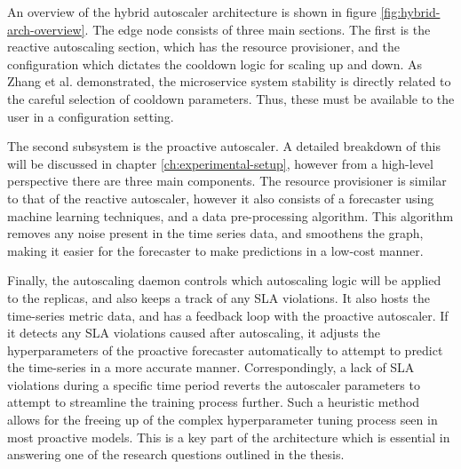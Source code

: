 An overview of the hybrid autoscaler architecture is shown in figure \ref{fig:hybrid-arch-overview}. The edge node consists of three main sections. The first is the reactive autoscaling section, which has the resource provisioner, and the configuration which dictates the cooldown logic for scaling up and down. As Zhang et al. \cite{zhang2019quantifying} demonstrated, the microservice system stability is directly related to the careful selection of cooldown parameters. Thus, these must be available to the user in a configuration setting.\par

The second subsystem is the proactive autoscaler. A detailed breakdown of this will be discussed in chapter \ref{ch:experimental-setup}, however from a high-level perspective there are three main components. The resource provisioner is similar to that of the reactive autoscaler, however it also consists of a forecaster using machine learning techniques, and a data pre-processing algorithm. This algorithm removes any noise present in the time series data, and smoothens the graph, making it easier for the forecaster to make predictions in a low-cost manner.\par

Finally, the autoscaling daemon controls which autoscaling logic will be applied to the replicas, and also keeps a track of any SLA violations. It also hosts the time-series metric data, and has a feedback loop with the proactive autoscaler. If it detects any SLA violations caused after autoscaling, it adjusts the hyperparameters of the proactive forecaster automatically to attempt to predict the time-series in a more accurate manner. Correspondingly, a lack of SLA violations during a specific time period reverts the autoscaler parameters to attempt to streamline the training process further. Such a heuristic method allows for the freeing up of the complex hyperparameter tuning process seen in most proactive models. This is a key part of the architecture which is essential in answering one of the research questions outlined in the thesis.\par



